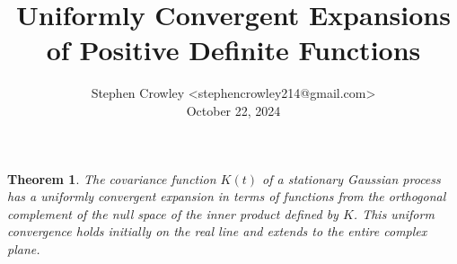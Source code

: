 \documentclass{article}
\newcommand{\tmaffiliation}[1]{\\ #1}
\newtheorem{theorem}{Theorem}
\begin{document}
\title{Uniformly Convergent Expansions of Positive Definite Functions}

\author{
  Stephen Crowley <stephencrowley214@gmail.com>
  \tmaffiliation{October 22, 2024}
}

\maketitle

\begin{theorem}
  The covariance function $K (t)$ of a stationary Gaussian process has a
  uniformly convergent expansion in terms of functions from the orthogonal
  complement of the null space of the inner product defined by $K$. This
  uniform convergence holds initially on the real line and extends to the
  entire complex plane.
\end{theorem}
\end{document}
